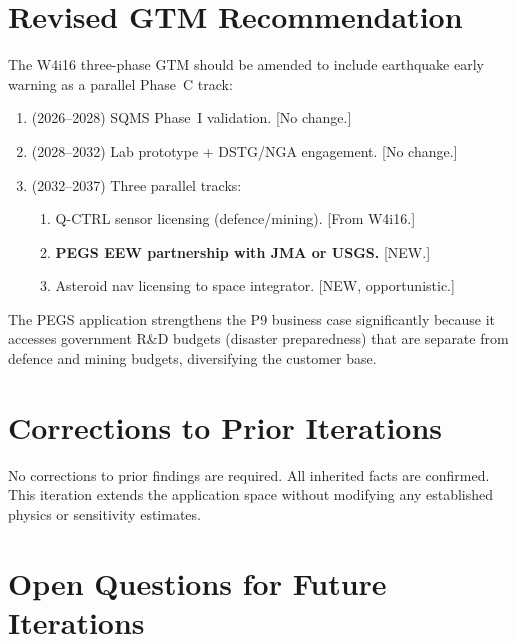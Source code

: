 \documentclass[11pt]{article}
\theoremstyle{definition}
\theoremstyle{remark}
\begin{document}
\section{Revised GTM Recommendation}
\label{sec:revised-gtm}

The W4i16 three-phase GTM should be amended to include earthquake
early warning as a parallel Phase~C track:

\begin{enumerate}[label=\textbf{Phase \Alph*:}]
  \item (2026--2028) SQMS Phase~I validation. [No change.]
  \item (2028--2032) Lab prototype + DSTG/NGA engagement. [No change.]
  \item (2032--2037) Three parallel tracks:
    \begin{enumerate}[label=(C\arabic*)]
      \item Q-CTRL sensor licensing (defence/mining). [From W4i16.]
      \item \textbf{PEGS EEW partnership with JMA or USGS.} [NEW.]
      \item Asteroid nav licensing to space integrator. [NEW, opportunistic.]
    \end{enumerate}
\end{enumerate}

The PEGS application strengthens the P9 business case significantly
because it accesses government R\&D budgets (disaster preparedness)
that are separate from defence and mining budgets, diversifying the
customer base.

\section*{Corrections to Prior Iterations}

No corrections to prior findings are required. All inherited facts
are confirmed. This iteration extends the application space without
modifying any established physics or sensitivity estimates.

\section*{Open Questions for Future Iterations}
\end{document}
